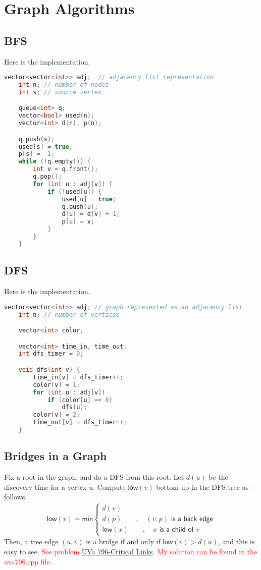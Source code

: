 \documentclass[12pt,a4paper]{amsart}
\numberwithin{equation}{section}
\theoremstyle{definition}
\begin{document}
\section{Graph Algorithms}

\subsection{BFS} Here is the implementation. 

\begin{lstlisting}[language=C++]
    vector<vector<int>> adj;  // adjacency list representation
    int n; // number of nodes
    int s; // source vertex

    queue<int> q;
    vector<bool> used(n);
    vector<int> d(n), p(n);

    q.push(s);
    used[s] = true;
    p[s] = -1;
    while (!q.empty()) {
        int v = q.front();
        q.pop();
        for (int u : adj[v]) {
            if (!used[u]) {
                used[u] = true;
                q.push(u);
                d[u] = d[v] + 1;
                p[u] = v;
            }
        }
    }
\end{lstlisting}

\subsection{DFS} Here is the implementation. 

\begin{lstlisting}[language=C++]
    vector<vector<int>> adj; // graph represented as an adjacency list
    int n; // number of vertices

    vector<int> color;

    vector<int> time_in, time_out;
    int dfs_timer = 0;

    void dfs(int v) {
        time_in[v] = dfs_timer++;
        color[v] = 1;
        for (int u : adj[v])
            if (color[u] == 0)
                dfs(u);
        color[v] = 2;
        time_out[v] = dfs_timer++;
    }
\end{lstlisting}

\subsection{Bridges in a Graph} Fix a root in the graph, and do a DFS from this root. Let $d(u)$ be the discovery time for a vertex $u$. Compute $\textsf{low}(v)$ bottom-up in the DFS tree as follows. 
\begin{align*}
    \textsf{low}(v) = \textsf{min}\begin{cases}
        d(v)\\
        d(p)\quad\quad , \quad (v , p)\textsf{ is a back edge}\\
        \textsf{low}(x)\quad\quad,\quad x\textsf{ is a child of }v
    \end{cases} 
\end{align*}
Then, a tree edge $(u , v)$ is a bridge if and only if $\textsf{low}(v) > d(u)$, and this is easy to see. \textcolor{red}{See problem \href{https://onlinejudge.org/index.php?option=com_onlinejudge&Itemid=8&page=show_problem&problem=737}{UVa 796-Critical Links}. My solution can be found in the uva796.cpp file.}
\end{document}
